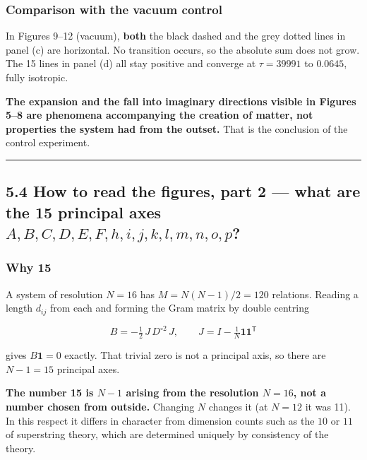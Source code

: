 \documentclass[
  10pt,
]{article}
\begin{document}
\subsubsection{Comparison with the vacuum
control}\label{comparison-with-the-vacuum-control}

In Figures 9--12 (vacuum), \textbf{both} the black dashed and the grey
dotted lines in panel (c) are horizontal. No transition occurs, so the
absolute sum does not grow. The 15 lines in panel (d) all stay positive
and converge at \(\tau=39991\) to \(0.0645\), fully isotropic.

\textbf{The expansion and the fall into imaginary directions visible in
Figures 5--8 are phenomena accompanying the creation of matter, not
properties the system had from the outset.} That is the conclusion of
the control experiment.

\begin{center}\rule{0.5\linewidth}{0.5pt}\end{center}

\subsection{\texorpdfstring{5.4 How to read the figures, part 2 --- what
are the 15 principal axes
\(A,B,C,D,E,F,h,i,j,k,l,m,n,o,p\)?}{5.4 How to read the figures, part 2 --- what are the 15 principal axes A,B,C,D,E,F,h,i,j,k,l,m,n,o,p?}}\label{how-to-read-the-figures-part-2-what-are-the-15-principal-axes-abcdefhijklmnop}

\subsubsection{Why 15}\label{why-15}

A system of resolution \(N=16\) has \(M = N(N-1)/2 = 120\) relations.
Reading a length \(d_{ij}\) from each and forming the Gram matrix by
double centring

\[B = -\tfrac12\,J\,D^{\circ2}\,J,\qquad J = I - \tfrac1N\mathbf{1}\mathbf{1}^{\mathsf T}\]

gives \(B\mathbf{1} = 0\) exactly. That trivial zero is not a principal
axis, so there are \(N-1 = 15\) principal axes.

\textbf{The number 15 is \(N-1\) arising from the resolution \(N=16\),
not a number chosen from outside.} Changing \(N\) changes it (at
\(N=12\) it was 11). In this respect it differs in character from
dimension counts such as the \(10\) or \(11\) of superstring theory,
which are determined uniquely by consistency of the theory.
\end{document}
